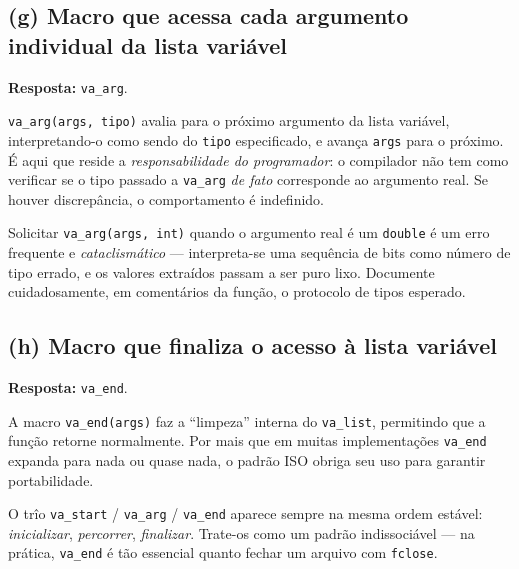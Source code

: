 \documentclass[11pt,a4paper]{article}
\begin{document}
\subsection*{(g) Macro que acessa cada argumento individual da lista vari\'avel}

\begin{resposta}\textbf{Resposta:} \texttt{va\_arg}.\end{resposta}

\texttt{va\_arg(args, tipo)} avalia para o pr\'oximo argumento da lista vari\'avel, interpretando-o como sendo do \texttt{tipo} especificado, e avan\c{c}a \texttt{args} para o pr\'oximo. \'E aqui que reside a \emph{responsabilidade do programador}: o compilador n\~ao tem como verificar se o tipo passado a \texttt{va\_arg} \emph{de fato} corresponde ao argumento real. Se houver discrep\^ancia, o comportamento \'e indefinido.

\begin{errocomum}
Solicitar \texttt{va\_arg(args, int)} quando o argumento real \'e um \texttt{double} \'e um erro frequente e \emph{cataclism\'atico} --- interpreta-se uma sequ\^encia de bits como n\'umero de tipo errado, e os valores extra\'idos passam a ser puro lixo. Documente cuidadosamente, em coment\'arios da fun\c{c}\~ao, o protocolo de tipos esperado.
\end{errocomum}

\subsection*{(h) Macro que finaliza o acesso \`a lista vari\'avel}

\begin{resposta}\textbf{Resposta:} \texttt{va\_end}.\end{resposta}

A macro \texttt{va\_end(args)} faz a ``limpeza'' interna do \texttt{va\_list}, permitindo que a fun\c{c}\~ao retorne normalmente. Por mais que em muitas implementa\c{c}\~oes \texttt{va\_end} expanda para nada ou quase nada, o padr\~ao ISO obriga seu uso para garantir portabilidade.

\begin{boaprat}
O tr\^io \texttt{va\_start} / \texttt{va\_arg} / \texttt{va\_end} aparece sempre na mesma ordem est\'avel: \emph{inicializar}, \emph{percorrer}, \emph{finalizar}. Trate-os como um padr\~ao indissoci\'avel --- na pr\'atica, \texttt{va\_end} \'e t\~ao essencial quanto fechar um arquivo com \texttt{fclose}.
\end{boaprat}
\end{document}
